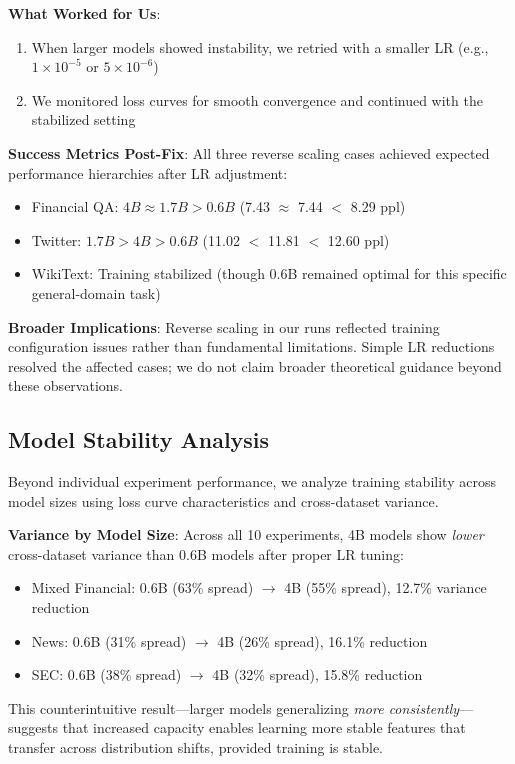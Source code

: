 \textbf{What Worked for Us}:
\begin{enumerate}
\item When larger models showed instability, we retried with a smaller LR (e.g., $1\times10^{-5}$ or $5\times10^{-6}$)
\item We monitored loss curves for smooth convergence and continued with the stabilized setting
\end{enumerate}

\textbf{Success Metrics Post-Fix}: All three reverse scaling cases achieved expected performance hierarchies after LR adjustment:
\begin{itemize}
\item Financial QA: $4B \approx 1.7B > 0.6B$ (7.43 $\approx$ 7.44 $<$ 8.29 ppl)
\item Twitter: $1.7B > 4B > 0.6B$ (11.02 $<$ 11.81 $<$ 12.60 ppl)
\item WikiText: Training stabilized (though 0.6B remained optimal for this specific general-domain task)
\end{itemize}

\textbf{Broader Implications}: Reverse scaling in our runs reflected training configuration issues rather than fundamental limitations. Simple LR reductions resolved the affected cases; we do not claim broader theoretical guidance beyond these observations.

\subsection{Model Stability Analysis}

Beyond individual experiment performance, we analyze training stability across model sizes using loss curve characteristics and cross-dataset variance.

\textbf{Variance by Model Size}: Across all 10 experiments, 4B models show \textit{lower} cross-dataset variance than 0.6B models after proper LR tuning:
\begin{itemize}
\item Mixed Financial: 0.6B (63\% spread) $\to$ 4B (55\% spread), 12.7\% variance reduction
\item News: 0.6B (31\% spread) $\to$ 4B (26\% spread), 16.1\% reduction
\item SEC: 0.6B (38\% spread) $\to$ 4B (32\% spread), 15.8\% reduction
\end{itemize}

This counterintuitive result---larger models generalizing \textit{more consistently}---suggests that increased capacity enables learning more stable features that transfer across distribution shifts, provided training is stable.


